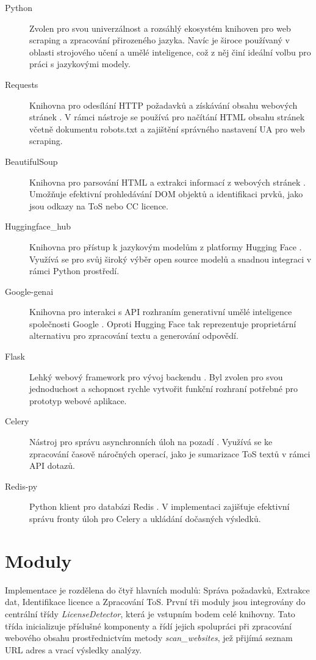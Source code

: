 \begin{description}
    \item[Python] Zvolen pro svou univerzálnost a rozsáhlý ekosystém knihoven pro web scraping a zpracování přirozeného jazyka. Navíc je široce používaný v oblasti strojového učení a umělé inteligence, což z něj činí ideální volbu pro práci s jazykovými modely.
    \item[Requests] Knihovna pro odesílání HTTP požadavků a získávání obsahu webových stránek \cite{requestsRequestsHTTP}. V rámci nástroje se používá pro načítání HTML obsahu stránek včetně dokumentu robots.txt a zajištění správného nastavení UA pro web scraping.
    \item[BeautifulSoup] Knihovna pro parsování HTML a extrakci informací z webových stránek \cite{crummyBeautifulSoup}. Umožňuje efektivní prohledávání DOM objektů a identifikaci prvků, jako jsou odkazy na ToS nebo CC licence.
    \item[Huggingface_hub] Knihovna pro přístup k jazykovým modelům z platformy Hugging Face \cite{huggingfaceClientLibrary}. Využívá se pro svůj široký výběr open source modelů a snadnou integraci v rámci Python prostředí.
    \item[Google-genai] Knihovna pro interakci s API rozhraním generativní umělé inteligence společnosti Google \cite{googleapisGoogleDocumentation}. Oproti Hugging Face tak reprezentuje proprietární alternativu pro zpracování textu a generování odpovědí.
    \item[Flask] Lehký webový framework pro vývoj backendu \cite{palletsprojectsWelcomeFlask}. Byl zvolen pro svou jednoduchost a schopnost rychle vytvořit funkční rozhraní potřebné pro prototyp webové aplikace.
    \item[Celery] Nástroj pro správu asynchronních úloh na pozadí \cite{celeryqCeleryDistributed}. Využívá se ke zpracování časově náročných operací, jako je sumarizace ToS textů v rámci API dotazů.
    \item[Redis-py] Python klient pro databázi Redis \cite{redisRedispy600}. V implementaci zajišťuje efektivní správu fronty úloh pro Celery a ukládání dočasných výsledků.
\end{description}

\section{Moduly}
Implementace je rozdělena do čtyř hlavních modulů: Správa požadavků, Extrakce dat, Identifikace licence a Zpracování ToS.
První tři moduly jsou integrovány do centrální třídy \textit{LicenseDetector}, která je vstupním bodem celé knihovny.
Tato třída inicializuje příslušné komponenty a řídí jejich spolupráci při zpracování webového obsahu prostřednictvím metody \textit{scan_websites}, jež přijímá seznam URL adres a vrací výsledky analýzy.

